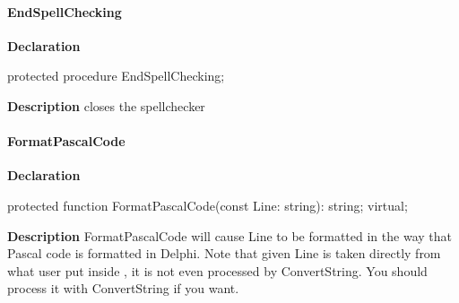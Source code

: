 \documentclass{report}
\newif\ifpdf
\begin{document}
\paragraph*{EndSpellChecking}\hspace*{\fill}

\label{PasDoc_Gen.TDocGenerator-EndSpellChecking}
\begin{list}{}{
\setlength{\itemindent}{0cm}
\setlength{\listparindent}{0cm}
\setlength{\leftmargin}{\evensidemargin}
\addtolength{\leftmargin}{\tmplength}
\settowidth{\labelsep}{X}
\addtolength{\leftmargin}{\labelsep}
\setlength{\labelwidth}{\tmplength}
}
\item[\textbf{Declaration}\hfill]
\ifpdf
\begin{flushleft}
\fi
\begin{ttfamily}
protected procedure EndSpellChecking;\end{ttfamily}

\ifpdf
\end{flushleft}
\fi

\par
\item[\textbf{Description}]
closes the spellchecker

\end{list}
\paragraph*{FormatPascalCode}\hspace*{\fill}

\label{PasDoc_Gen.TDocGenerator-FormatPascalCode}
\begin{list}{}{
\setlength{\itemindent}{0cm}
\setlength{\listparindent}{0cm}
\setlength{\leftmargin}{\evensidemargin}
\addtolength{\leftmargin}{\tmplength}
\settowidth{\labelsep}{X}
\addtolength{\leftmargin}{\labelsep}
\setlength{\labelwidth}{\tmplength}
}
\item[\textbf{Declaration}\hfill]
\ifpdf
\begin{flushleft}
\fi
\begin{ttfamily}
protected function FormatPascalCode(const Line: string): string; virtual;\end{ttfamily}

\ifpdf
\end{flushleft}
\fi

\par
\item[\textbf{Description}]
FormatPascalCode will cause Line to be formatted in the way that Pascal code is formatted in Delphi. Note that given Line is taken directly from what user put inside \texttt{}, it is not even processed by ConvertString. You should process it with ConvertString if you want.

\end{list}
\end{document}
